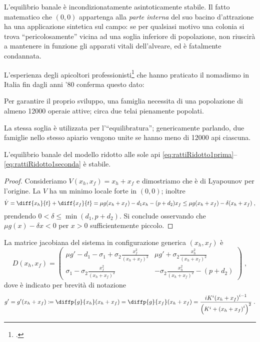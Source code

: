 L'equilibrio banale è incondizionatamente asintoticamente stabile.
Il fatto matematico che $(0,0)$ appartenga alla \emph{parte interna} del suo bacino d'attrazione
ha una applicazione sintetica sul campo: se per qualsiasi motivo una colonia si trova ``pericolosamente''
vicina ad una soglia inferiore di popolazione, non riuscirà a mantenere in funzione gli apparati vitali
dell'alveare, ed è fatalmente condannata.

L'esperienza degli apicoltori professionisti\footcite{privFDL,privFPan} che hanno praticato il nomadismo in Italia
fin dagli anni '80 conferma questo dato:
\begin{displayquote}
Per garantire il proprio sviluppo, una famiglia necessita di una popolazione di
almeno 12000 operaie attive; circa due telai pienamente popolati.

La stessa soglia è utilizzata per l'``equilibratura''; genericamente parlando, due famiglie nello stesso apiario
vengono unite se hanno meno di 12000 api ciascuna.
\end{displayquote}

\begin{proposizione}
    L'equilibrio banale del modello ridotto alle sole api
    \eqref{eq:rattiRidotto1prima}--\eqref{eq:rattiRidotto1seconda}
    è stabile.
    \label{prop:r0Stab2d}
\end{proposizione}

\begin{proof}
Consideriamo $V(x_h, x_f) = x_h + x_f$ e dimostriamo che è di Lyapounov per l'origine.
La $V$ ha un minimo locale forte in $(0,0)$; inoltre
$$\dot{V} = \diff{x_h}{t} + \diff{x_f}{t} = \mu g(x_h + x_f) -d_1 x_h - (p+d_2) x_f
\leq
 \mu g(x_h + x_f) - \delta (x_h + x_f)
\; ,$$
prendendo $0 < \delta \leq \min (d_1, p + d_2)$.
Si conclude osservando che $\mu g(x) - \delta x <0$ per $x>0$ sufficientemente piccolo.
\end{proof}

La matrice jacobiana del sistema in configurazione generica $(x_h, x_f)$ è
\begin{equation}
    D(x_h, x_f) =
    \begin{pmatrix}
        \mu g' -d_1 - \sigma_1 + \sigma_2 \frac{x_f^2}{{(x_h+x_f)}^2}
        & \mu g' + \sigma_2 \frac{x_h^2}{{(x_h+x_f)}^2}
        \\
        \sigma_1 - \sigma_2 \frac{x_f^2}{{(x_h+x_f)}^2}
        & - \sigma_2 \frac{x_h^2}{{(x_h+x_f)}^2} - (p+d_2)
    \end{pmatrix} \; ,
    \label{eq:r17jaco}
\end{equation}
dove è indicato per brevità di notazione
\begin{equation}
    g' = g'(x_h+x_f) \coloneq \diffp{g}{{x_h}} (x_h + x_f) = \diffp{g}{{x_f}} (x_h + x_f) =
    \frac{ iK^i {(x_h + x_f)}^{i-1} }{ { \left( K^i + {(x_h +x_f)}^i \right)  }^2 }
    \; .
    \label{eq:gPrimo}
\end{equation}

